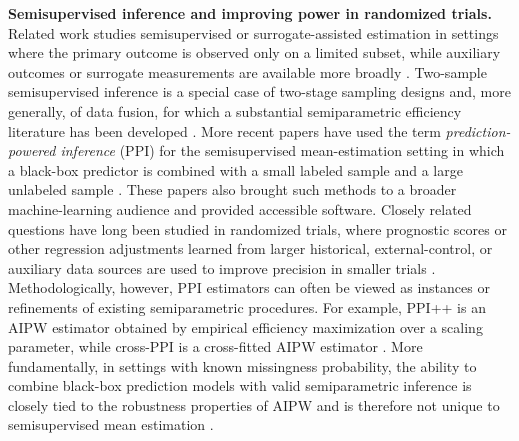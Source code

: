 \documentclass{article}
\theoremstyle{plain}
\theoremstyle{definition}
\newcommand{\1}{\mathbbm{1}}
\begin{document}
\textbf{Semisupervised inference and improving power in randomized trials.}
Related work studies semisupervised or surrogate-assisted estimation in settings where the primary outcome is observed only on a limited subset, while auxiliary outcomes or surrogate measurements are available more broadly \citep{pepe1992inference,pepe1994auxiliary,chen2000miscellanea,chen2008improving,cheng2021robust,ji2025predictions,kallus2025role}. Two-sample semisupervised inference is a special case of two-stage sampling designs \citep{scott1982effect,rose2011targeted,hejazi2021efficient,qiu2026efficient} and, more generally, of data fusion, for which a substantial semiparametric efficiency literature has been developed \citep{li2023efficient,li2025data,graham2024towards,xu2025unified}. More recent papers have used the term \emph{prediction-powered inference} (PPI) for the semisupervised mean-estimation setting in which a black-box predictor is combined with a small labeled sample and a large unlabeled sample \citep{ppi2023,angelopoulos2023ppi,crossppi2024,xu2025unified,song2026demystifying,poulet2025prediction,wang2025efficient,lee2026mec}. These papers also brought such methods to a broader machine-learning audience and provided accessible software. Closely related questions have long been studied in randomized trials, where prognostic scores or other regression adjustments learned from larger historical, external-control, or auxiliary data sources are used to improve precision in smaller trials \citep{hansen2008prognostic,rosenblum2009using,moore2009covariate,moore2009increasing,moore2011robust,vanderweele2019selecting,benkeser2021improving,burger2021use,schuler2022increasing,li2023estimating,balzer2024adaptive,van2024covariate,hojbjerre2025powering,yang2026improving}. Methodologically, however, PPI estimators can often be viewed as instances or refinements of existing semiparametric procedures. For example, PPI++ is an AIPW estimator \citep{robins1994estimation,vanderlaanunified} obtained by empirical efficiency maximization \citep{rubin2008empirical} over a scaling parameter, while cross-PPI \citep{crossppi2024} is a cross-fitted AIPW estimator \citep{zheng2010asymptotic,DoubleML}. More fundamentally, in settings with known missingness probability, the ability to combine black-box prediction models with valid semiparametric inference is closely tied to the robustness properties of AIPW and is therefore not unique to semisupervised mean estimation \citep{bang2005doubly,seaman2018introduction,rotnitzky2021characterization}.
\end{document}
